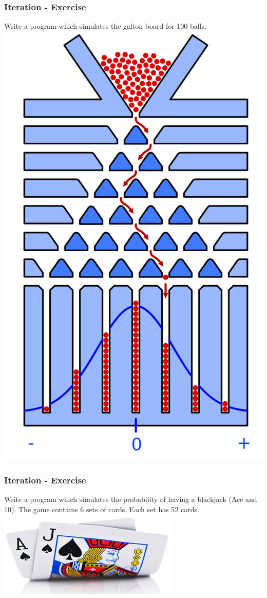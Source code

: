 \begin{frame}[fragile]
\frametitle{Iteration - Exercise}
\begin{exercise}
Write a program which simulates the galton board for 100 balls.\\
\includegraphics[scale=0.04]{img/galton.png}
\end{exercise}
\end{frame}

\begin{frame}[fragile]
\frametitle{Iteration - Exercise}
\begin{exercise}
Write a program which simulates the probability of having a blackjack (Ace and 10).
The game contains 6 sets of cards. Each set has 52 cards.\\
\includegraphics[scale=0.5]{img/blackjack.jpg}
\end{exercise}
\end{frame}


